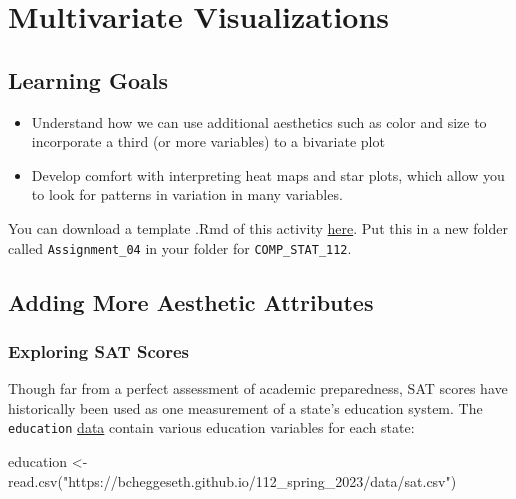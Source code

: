 \documentclass[
  letterpaper,
  DIV=11,
  numbers=noendperiod]{scrreprt}
\newenvironment{Shaded}{\begin{snugshade}}{\end{snugshade}}
\newcommand{\FunctionTok}[1]{\textcolor[rgb]{0.28,0.35,0.67}{#1}}
\newcommand{\NormalTok}[1]{\textcolor[rgb]{0.00,0.23,0.31}{#1}}
\newcommand{\OtherTok}[1]{\textcolor[rgb]{0.00,0.23,0.31}{#1}}
\newcommand{\StringTok}[1]{\textcolor[rgb]{0.13,0.47,0.30}{#1}}
\providecommand{\tightlist}{%
  \setlength{\itemsep}{0pt}\setlength{\parskip}{0pt}}\usepackage{longtable,booktabs,array}
\begin{document}
\chapter{Multivariate Visualizations}\label{multivariate-visualizations}

\section*{Learning Goals}\label{learning-goals-4}


\begin{itemize}
\tightlist
\item
  Understand how we can use additional aesthetics such as color and size
  to incorporate a third (or more variables) to a bivariate plot
\item
  Develop comfort with interpreting heat maps and star plots, which
  allow you to look for patterns in variation in many variables.
\end{itemize}

You can download a template .Rmd of this activity
\href{template_rmd/05-Multivariate_Viz_Assign.Rmd}{here}. Put this in a
new folder called \texttt{Assignment\_04} in your folder for
\texttt{COMP\_STAT\_112}.

\section*{Adding More Aesthetic
Attributes}\label{adding-more-aesthetic-attributes}


\subsection*{Exploring SAT Scores}\label{exploring-sat-scores}

Though far from a perfect assessment of academic preparedness, SAT
scores have historically been used as one measurement of a state's
education system. The \texttt{education} \href{data/sat.csv}{data}
contain various education variables for each state:

\begin{Shaded}
\begin{Highlighting}[]
\NormalTok{education }\OtherTok{\textless{}{-}} \FunctionTok{read.csv}\NormalTok{(}\StringTok{"https://bcheggeseth.github.io/112\_spring\_2023/data/sat.csv"}\NormalTok{)}
\end{Highlighting}
\end{Shaded}
\end{document}
